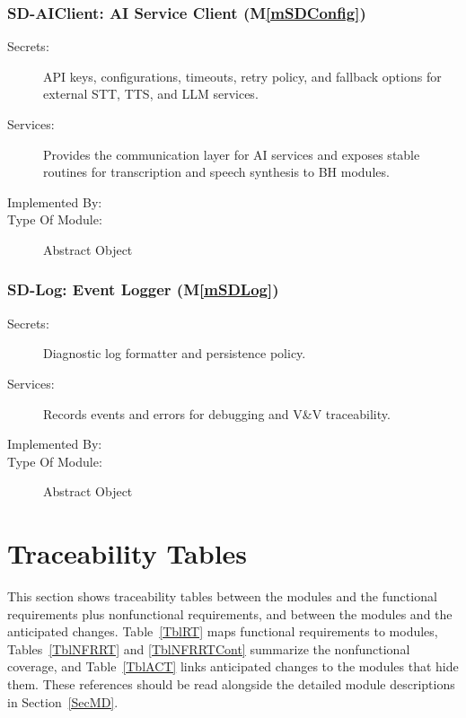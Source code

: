 \documentclass[12pt, titlepage]{article}
\newcommand{\mref}[1]{M\ref{#1}}
\begin{document}
\subsubsection{SD-AIClient: AI Service Client (\mref{mSDConfig})}
\begin{description}
\item[Secrets:] API keys, configurations, timeouts, retry policy, and fallback
options for external STT, TTS, and LLM services.
\item[Services:] Provides the communication layer for AI services and exposes
stable routines for transcription and speech synthesis to BH modules.
\item[Implemented By:] \progname{}
\item[Type Of Module:] Abstract Object
\end{description}

\subsubsection{SD-Log: Event Logger (\mref{mSDLog})}
\begin{description}
\item[Secrets:] Diagnostic log formatter and persistence policy.
\item[Services:] Records events and errors for debugging and V\&V traceability.
\item[Implemented By:] \progname{}
\item[Type Of Module:] Abstract Object
\end{description}

\section{Traceability Tables} \label{SecTM}

This section shows traceability tables between the modules and the functional
requirements plus nonfunctional requirements, and between the modules and the
anticipated changes. Table~\ref{TblRT} maps functional requirements to modules,
Tables~\ref{TblNFRRT} and \ref{TblNFRRTCont} summarize the nonfunctional
coverage, and Table~\ref{TblACT} links anticipated changes to the modules that
hide them. These references should be read alongside the detailed module
descriptions in Section~\ref{SecMD}.
\end{document}
